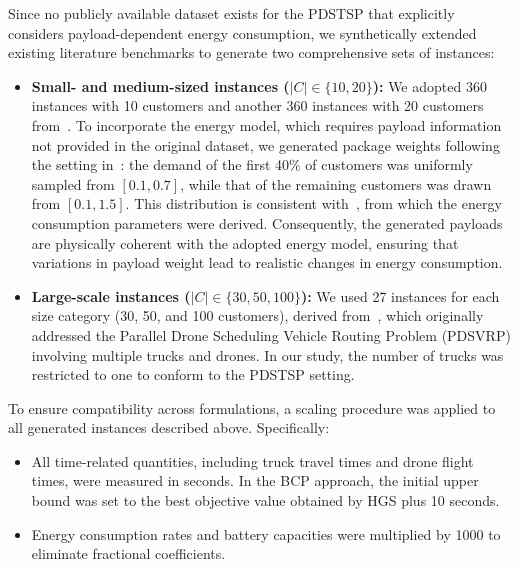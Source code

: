 \documentclass[3p, authoryear, 11pt]{elsarticle}
\begin{document}
Since no publicly available dataset exists for the PDSTSP that explicitly considers payload-dependent energy consumption, we synthetically extended existing literature benchmarks to generate two comprehensive sets of instances:

\begin{itemize}
    \item \textbf{Small- and medium-sized instances ($|C| \in \{10, 20\}$):}  
    We adopted 360 instances with 10 customers and another 360 instances with 20 customers from~\cite{murray_flying_2015}.  
    To incorporate the energy model, which requires payload information not provided in the original dataset, we generated package weights following the setting in~\cite{cheng_drone_2020}:  
    the demand of the first 40\% of customers was uniformly sampled from $[0.1, 0.7]$, while that of the remaining customers was drawn from $[0.1, 1.5]$.  
    This distribution is consistent with~\cite{dorling_vehicle_2017}, from which the energy consumption parameters were derived.
    Consequently, the generated payloads are physically coherent with the adopted energy model, ensuring that variations in payload weight lead to realistic changes in energy consumption.

    \item \textbf{Large-scale instances ($|C| \in \{30, 50, 100\}$):}  
    We used 27 instances for each size category (30, 50, and 100 customers), derived from~\cite{nguyen_min_cost_2022}, which originally addressed the Parallel Drone Scheduling Vehicle Routing Problem (PDSVRP) involving multiple trucks and drones.  
    In our study, the number of trucks was restricted to one to conform to the PDSTSP setting.  
\end{itemize}

To ensure compatibility across formulations, a scaling procedure was applied to all generated instances described above. Specifically:

\begin{itemize}
    \item All time-related quantities, including truck travel times and drone flight times, were measured in seconds. In the BCP approach, the initial upper bound was set to the best objective value obtained by HGS plus 10 seconds.

    \item Energy consumption rates and battery capacities were multiplied by 1000 to eliminate fractional coefficients.
\end{itemize}
\end{document}
